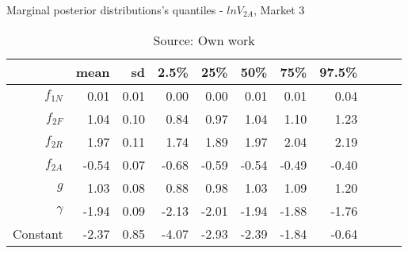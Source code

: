 \begin{table}[H]
\caption{Marginal posterior distributions's quantiles - $ln V_{2A}$,  Market 3}
\centering
\begin{tabular}{rrrrrrrrrrr}
  \toprule
          & mean  & sd   & 2.5\% & 25\%  & 50\%  & 75\%  & 97.5\%\\ 
  \hline
  $f_{1N}$ & 0.01  & 0.01 & 0.00  & 0.00  & 0.01  & 0.01  & 0.04  \\ 
  $f_{2F}$ & 1.04  & 0.10 & 0.84  & 0.97  & 1.04  & 1.10  & 1.23  \\ 
  $f_{2R}$ & 1.97  & 0.11 & 1.74  & 1.89  & 1.97  & 2.04  & 2.19  \\ 
  $f_{2A}$ & -0.54 & 0.07 & -0.68 & -0.59 & -0.54 & -0.49 & -0.40 \\ 
  $g$      & 1.03  & 0.08 & 0.88  & 0.98  & 1.03  & 1.09  & 1.20  \\ 
  $\gamma$ & -1.94 & 0.09 & -2.13 & -2.01 & -1.94 & -1.88 & -1.76 \\ 
  Constant & -2.37 & 0.85 & -4.07 & -2.93 & -2.39 & -1.84 & -0.64 \\ 
     \bottomrule
\end{tabular}
\caption*{Source: Own work}
\end{table}
